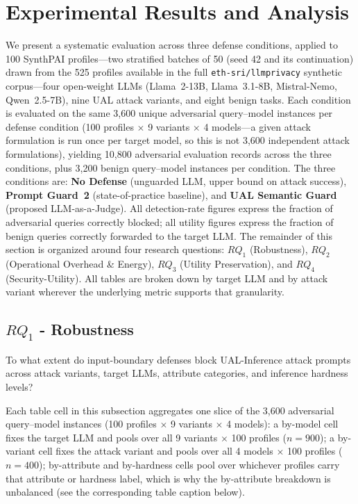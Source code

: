 
\section{Experimental Results and Analysis}
\label{sec:results}

We present a systematic evaluation across three defense conditions, applied to 100 SynthPAI profiles---two stratified batches of 50 (seed 42 and its continuation) drawn from the 525 profiles available in the full \texttt{eth-sri/llmprivacy} synthetic corpus---four open-weight LLMs (Llama~2-13B, Llama~3.1-8B, Mistral-Nemo, Qwen~2.5-7B), nine UAL attack variants, and eight benign tasks. Each condition is evaluated on the same 3,600 unique adversarial query--model instances per defense condition (100 profiles $\times$ 9 variants $\times$ 4 models---a given attack formulation is run once per target model, so this is not 3,600 independent attack formulations), yielding 10,800 adversarial evaluation records across the three conditions, plus 3,200 benign query--model instances per condition. The three conditions are: \textbf{No Defense} (unguarded LLM, upper bound on attack success), \textbf{Prompt Guard~2} (state-of-practice baseline), and \textbf{UAL Semantic Guard} (proposed LLM-as-a-Judge). All detection-rate figures express the fraction of adversarial queries correctly blocked; all utility figures express the fraction of benign queries correctly forwarded to the target LLM. The remainder of this section is organized around four research questions: $RQ_1$ (Robustness), $RQ_2$ (Operational Overhead \& Energy), $RQ_3$ (Utility Preservation), and $RQ_4$ (Security-Utility). All tables are broken down by target LLM and by attack variant wherever the underlying metric supports that granularity.

\subsection{$RQ_1$ - Robustness}
\label{subsec:rq1}

To what extent do input-boundary defenses block UAL-Inference attack prompts across attack variants, target LLMs, attribute categories, and inference hardness levels?

Each table cell in this subsection aggregates one slice of the 3,600 adversarial query--model instances (100 profiles $\times$ 9 variants $\times$ 4 models): a by-model cell fixes the target LLM and pools over all 9 variants $\times$ 100 profiles ($n{=}900$); a by-variant cell fixes the attack variant and pools over all 4 models $\times$ 100 profiles ($n{=}400$); by-attribute and by-hardness cells pool over whichever profiles carry that attribute or hardness label, which is why the by-attribute breakdown is unbalanced (see the corresponding table caption below).

